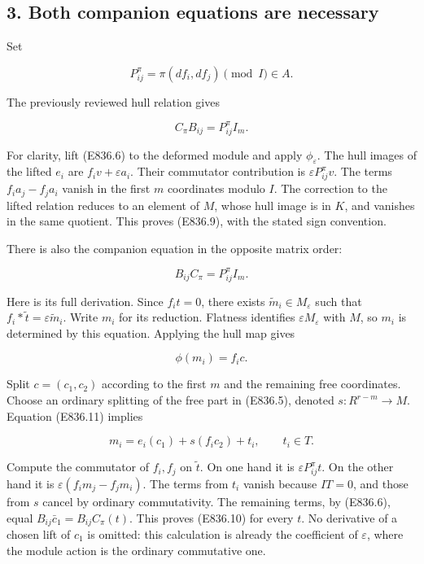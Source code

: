 \subsection{3. Both companion equations are
necessary}\label{both-companion-equations-are-necessary}

Set

\[
 P^\pi_{ij}=\pi(df_i,df_j)\pmod I\in A.
\]

The previously reviewed hull relation gives

\[
 C_\pi B_{ij}=P^\pi_{ij}I_m.
 \tag{E836.9}
\]

For clarity, lift (E836.6) to the deformed module and apply
\(\phi_\varepsilon\). The hull images of the lifted \(e_i\) are
\(f_i v+\varepsilon a_i\). Their commutator contribution is
\(\varepsilon P^\pi_{ij}v\). The terms \(f_i a_j-f_j a_i\) vanish in the
first \(m\) coordinates modulo \(I\). The correction to the lifted
relation reduces to an element of \(M\), whose hull image is in \(K\),
and vanishes in the same quotient. This proves (E836.9), with the stated
sign convention.

There is also the companion equation in the opposite matrix order:

\[
 B_{ij}C_\pi=P^\pi_{ij}I_m.
 \tag{E836.10}
\]

Here is its full derivation. Since \(f_i t=0\), there exists
\(\widetilde m_i\in M_\varepsilon\) such that
\(f_i*\widetilde t=\varepsilon\widetilde m_i\). Write \(m_i\) for its
reduction. Flatness identifies \(\varepsilon M_\varepsilon\) with \(M\),
so \(m_i\) is determined by this equation. Applying the hull map gives

\[
 \phi(m_i)=f_i c.
 \tag{E836.11}
\]

Split \(c=(c_1,c_2)\) according to the first \(m\) and the remaining
free coordinates. Choose an ordinary splitting of the free part in
(E836.5), denoted \(s:R^{r-m}\to M\). Equation (E836.11) implies

\[
 m_i=e_i(c_1)+s(f_i c_2)+t_i,
 \qquad t_i\in T.
 \tag{E836.12}
\]

Compute the commutator of \(f_i,f_j\) on \(\widetilde t\). On one hand
it is \(\varepsilon P^\pi_{ij}t\). On the other hand it is
\(\varepsilon(f_i m_j-f_j m_i)\). The terms from \(t_i\) vanish because
\(I T=0\), and those from \(s\) cancel by ordinary commutativity. The
remaining terms, by (E836.6), equal \(B_{ij}\bar c_1=B_{ij}C_\pi(t)\).
This proves (E836.10) for every \(t\). No derivative of a chosen lift of
\(c_1\) is omitted: this calculation is already the coefficient of
\(\varepsilon\), where the module action is the ordinary commutative
one.

